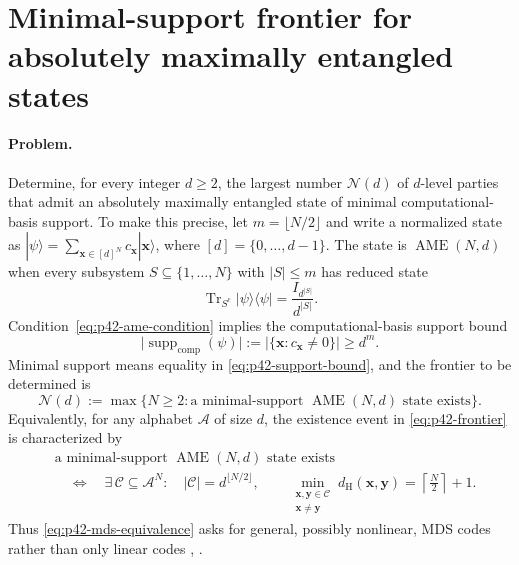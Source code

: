 \section{Minimal-support frontier for absolutely maximally entangled states}
\label{sec:problem-42}

\paragraph{Problem.}
Determine, for every integer $d\geq 2$, the largest number $\mathcal N(d)$ of
$d$-level parties that admit an absolutely maximally entangled state of
minimal computational-basis support.  To make this precise, let
$m=\lfloor N/2\rfloor$ and write a normalized state as
$|\psi\rangle=\sum_{\boldsymbol{x}\in[d]^N}c_{\boldsymbol{x}}
|\boldsymbol{x}\rangle$, where $[d]=\{0,\ldots,d-1\}$.  The state is
$\operatorname{AME}(N,d)$ when every subsystem $S\subseteq\{1,\ldots,N\}$
with $|S|\leq m$ has reduced state
\begin{equation}
  \operatorname{Tr}_{S^{\mathrm c}}|\psi\rangle\!\langle\psi|
  =\frac{I_{d^{|S|}}}{d^{|S|}}.
  \label{eq:p42-ame-condition}
\end{equation}
Condition~\eqref{eq:p42-ame-condition} implies the computational-basis
support bound
\begin{equation}
  \bigl|\operatorname{supp}_{\mathrm{comp}}(\psi)\bigr|
  :=\bigl|\{\boldsymbol{x}:c_{\boldsymbol{x}}\neq0\}\bigr|
  \geq d^{m}.
  \label{eq:p42-support-bound}
\end{equation}
Minimal support means equality in \eqref{eq:p42-support-bound}, and the
frontier to be determined is
\begin{equation}
  \mathcal N(d):=\max\bigl\{N\geq2:\text{a minimal-support }
  \operatorname{AME}(N,d)\text{ state exists}\bigr\}.
  \label{eq:p42-frontier}
\end{equation}
Equivalently, for any alphabet $\mathcal A$ of size $d$, the existence event
in \eqref{eq:p42-frontier} is characterized by
\begin{equation}
  \begin{split}
  &\text{a minimal-support }\operatorname{AME}(N,d)\text{ state exists}
  \\
  &\quad\Longleftrightarrow\quad
  \exists\,\mathcal C\subseteq\mathcal A^N:\quad
  |\mathcal C|=d^{\lfloor N/2\rfloor},\qquad
  \min_{\substack{\boldsymbol{x},\boldsymbol{y}\in\mathcal C\\
                   \boldsymbol{x}\neq\boldsymbol{y}}}
  d_{\mathrm H}(\boldsymbol{x},\boldsymbol{y})
  =\left\lceil\frac N2\right\rceil+1.
  \end{split}
  \label{eq:p42-mds-equivalence}
\end{equation}
Thus \eqref{eq:p42-mds-equivalence} asks for general, possibly nonlinear,
MDS codes rather than only linear codes
,
.

